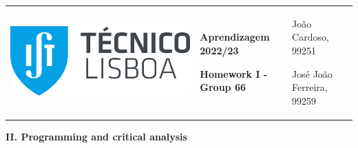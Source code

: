 \documentclass[11pt,a4paper]{article}
\begin{document}
\pagebreak

\color{darkgray}
\hspace{-8.25mm}
\begin{tabularx}{1.09\textwidth} {>{\raggedright\arraybackslash}X >{\centering\arraybackslash}X >{\raggedleft\arraybackslash}X}
  \includegraphics[scale=0.2]{tecnico.pdf} &
  \textbf{Aprendizagem 2022/23} \par \textbf{Homework I - Group 66} &
  João Cardoso, 99251 \par José João Ferreira, 99259
\end{tabularx}
\color{black}

\begin{center}
\textbf{II. Programming and critical analysis}
\end{center}
\end{document}
